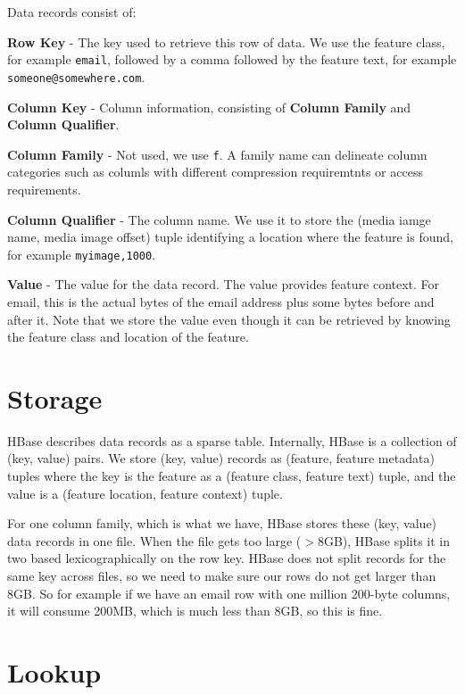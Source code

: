 \documentclass[12pt,twoside]{article}
\begin{document}
Data records consist of:
\begin{compactitem}
\item \textbf{Row Key} - The key used to retrieve this row of data. We use the feature class, for example \texttt{email}, followed by a comma followed by the feature text, for example \texttt{someone@somewhere.com}.
\item \textbf{Column Key} - Column information, consisting of \textbf{Column Family} and \textbf{Column Qualifier}.
  \begin{compactitem}
  \item \textbf{Column Family} - Not used, we use \texttt{f}. A family name can delineate column categories such as columls with different compression requiremtnts or access requirements.
  \item \textbf{Column Qualifier} - The column name.  We use it to store the (media iamge name, media image offset) tuple identifying a location where the feature is found, for example \texttt{myimage,1000}.
  \end{compactitem}
\item \textbf{Value} - The value for the data record.  The value provides feature context. For email, this is the actual bytes of the email address plus some bytes before and after it. Note that we store the value even though it can be retrieved by knowing the feature class and location of the feature.
\end{compactitem}

\section*{Storage}
HBase describes data records as a sparse table. Internally, HBase is a collection of (key, value) pairs. We store (key, value) records as (feature, feature metadata) tuples where the key is the feature as a (feature class, feature text) tuple, and the value is a (feature location, feature context) tuple.

For one column family, which is what we have, HBase stores these (key, value) data records in one file.
When the file gets too large ($>$8GB), HBase splits it in two based lexicographically on the row key.  HBase does not split records for the same key across files, so we need to make sure our rows do not get larger than 8GB.  So for example if we have an email row with one million 200-byte columns, it will consume 200MB, which is much less than 8GB, so this is fine.

\section*{Lookup}
\end{document}
